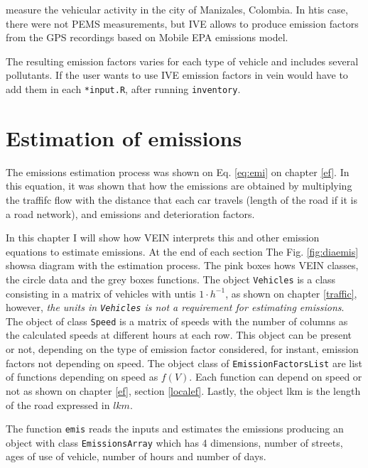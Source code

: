 \documentclass[12pt,graybox,envcountchap,sectrefs]{krantz}
\theoremstyle{definition}
\theoremstyle{definition}
\theoremstyle{definition}
\theoremstyle{remark}
\begin{document}
\citet{gonzalez2017relative} measure the vehicular activity in the city
of Manizales, Colombia. In htis case, there were not PEMS measurements,
but IVE allows to produce emission factors from the GPS recordings based
on Mobile EPA emissions
model\citep[\citet{Davisetal2005}]{arbor2003user}.

The resulting emission factors varies for each type of vehicle and
includes several pollutants. If the user wants to use IVE emission
factors in vein would have to add them in each \texttt{*input.R}, after
running \texttt{inventory}.

\chapter{Estimation of emissions}\label{est}

The emissions estimation process was shown on Eq. \eqref{eq:emi} on
chapter \ref{ef}. In this equation, it was shown that how the emissions
are obtained by multiplying the traffifc flow with the distance that
each car travels (length of the road if it is a road network), and
emissions and deterioration factors.

In this chapter I will show how VEIN interprets this and other emission
equations to estimate emissions. At the end of each section The Fig.
\ref{fig:diaemis} showsa diagram with the estimation process. The pink
boxes hows VEIN classes, the circle data and the grey boxes functions.
The object \texttt{Vehicles} is a class consisting in a matrix of
vehicles with untis \(1 \cdot h^{-1}\), as shown on chapter
\ref{traffic}, however, \emph{the units in \texttt{Vehicles} is not a
requirement for estimating emissions}. The object of class
\texttt{Speed} is a matrix of speeds with the number of columns as the
calculated speeds at different hours at each row. This object can be
present or not, depending on the type of emission factor considered, for
instant, emission factors not depending on speed. The object class of
\texttt{EmissionFactorsList} are list of functions depending on speed as
\(f(V)\). Each function can depend on speed or not as shown on chapter
\ref{ef}, section \ref{localef}. Lastly, the object lkm is the length of
the road expressed in \(lkm\).

The function \texttt{emis} reads the inputs and estimates the emissions
producing an object with class \texttt{EmissionsArray} which has 4
dimensions, number of streets, ages of use of vehicle, number of hours
and number of days.
\end{document}
